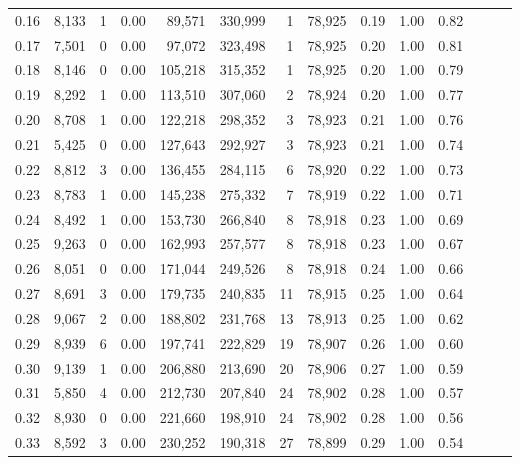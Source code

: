 \begin{tabular}{rrrrrrrrrrrrrr}
0.16 &   8,133 &      1 &  0.00 &   89,571 &  330,999 &       1 &  78,925 &  0.19 &  1.00 &      0.82 \\
0.17 &   7,501 &      0 &  0.00 &   97,072 &  323,498 &       1 &  78,925 &  0.20 &  1.00 &      0.81 \\
0.18 &   8,146 &      0 &  0.00 &  105,218 &  315,352 &       1 &  78,925 &  0.20 &  1.00 &      0.79 \\
0.19 &   8,292 &      1 &  0.00 &  113,510 &  307,060 &       2 &  78,924 &  0.20 &  1.00 &      0.77 \\
0.20 &   8,708 &      1 &  0.00 &  122,218 &  298,352 &       3 &  78,923 &  0.21 &  1.00 &      0.76 \\
0.21 &   5,425 &      0 &  0.00 &  127,643 &  292,927 &       3 &  78,923 &  0.21 &  1.00 &      0.74 \\
0.22 &   8,812 &      3 &  0.00 &  136,455 &  284,115 &       6 &  78,920 &  0.22 &  1.00 &      0.73 \\
0.23 &   8,783 &      1 &  0.00 &  145,238 &  275,332 &       7 &  78,919 &  0.22 &  1.00 &      0.71 \\
0.24 &   8,492 &      1 &  0.00 &  153,730 &  266,840 &       8 &  78,918 &  0.23 &  1.00 &      0.69 \\
0.25 &   9,263 &      0 &  0.00 &  162,993 &  257,577 &       8 &  78,918 &  0.23 &  1.00 &      0.67 \\
0.26 &   8,051 &      0 &  0.00 &  171,044 &  249,526 &       8 &  78,918 &  0.24 &  1.00 &      0.66 \\
0.27 &   8,691 &      3 &  0.00 &  179,735 &  240,835 &      11 &  78,915 &  0.25 &  1.00 &      0.64 \\
0.28 &   9,067 &      2 &  0.00 &  188,802 &  231,768 &      13 &  78,913 &  0.25 &  1.00 &      0.62 \\
0.29 &   8,939 &      6 &  0.00 &  197,741 &  222,829 &      19 &  78,907 &  0.26 &  1.00 &      0.60 \\
0.30 &   9,139 &      1 &  0.00 &  206,880 &  213,690 &      20 &  78,906 &  0.27 &  1.00 &      0.59 \\
0.31 &   5,850 &      4 &  0.00 &  212,730 &  207,840 &      24 &  78,902 &  0.28 &  1.00 &      0.57 \\
0.32 &   8,930 &      0 &  0.00 &  221,660 &  198,910 &      24 &  78,902 &  0.28 &  1.00 &      0.56 \\
0.33 &   8,592 &      3 &  0.00 &  230,252 &  190,318 &      27 &  78,899 &  0.29 &  1.00 &      0.54 \\

\end{tabular}
